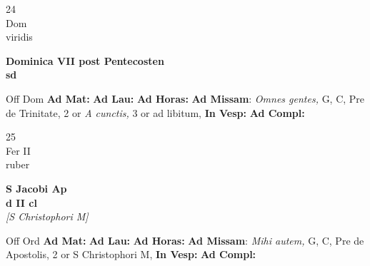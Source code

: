 \documentclass[10pt, openany]{book}
\begin{document}
        \begin{center}
            \begin{minipage}{3.5in}
                \vspace{2em}
                \begin{minipage}{0.5in}
                    {\Huge 24} \\
                    {\normalsize Dom} \\
                    {\normalsize viridis}
                \end{minipage}
                \begin{minipage}{3.0in}
                    \textbf{ \large Dominica VII post Pentecosten \\
                    \textnormal{\normalsize sd}} \\ 
                \end{minipage}
                \begin{justify}Off Dom
                    \textbf{Ad Mat: }
                    \textbf{Ad Lau: }
                    \textbf{Ad Horas: }\textbf{Ad Missam}: \textit{Omnes gentes,} G, C, Pre de Trinitate, 2 or \textit{A cunctis,} 3 or ad libitum,  
                    \textbf{In Vesp: }
                    \textbf{Ad Compl: }
                \end{justify}
            \end{minipage}
        \end{center}
    
        \begin{center}
            \begin{minipage}{3.5in}
                \vspace{2em}
                \begin{minipage}{0.5in}
                    {\Huge 25} \\
                    {\normalsize Fer II} \\
                    {\normalsize ruber}
                \end{minipage}
                \begin{minipage}{3.0in}
                    \textbf{ \large S Jacobi Ap \\
                    \textnormal{\normalsize d II cl}} \\ \textit{[S Christophori M]} \\ 
                \end{minipage}
                \begin{justify}Off Ord
                    \textbf{Ad Mat: }
                    \textbf{Ad Lau: }
                    \textbf{Ad Horas: }\textbf{Ad Missam}: \textit{Mihi autem,} G, C, Pre de Apostolis, 2 or S Christophori M,  
                    \textbf{In Vesp: }
                    \textbf{Ad Compl: }
                \end{justify}
            \end{minipage}
        \end{center}
    
\end{document}
